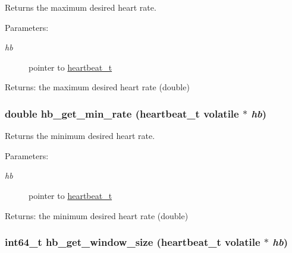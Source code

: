 Returns the maximum desired heart rate. 

\begin{Desc}
\item[Parameters:]
\begin{description}
\item[{\em hb}]pointer to \hyperlink{structheartbeat__t}{heartbeat\_\-t} \end{description}
\end{Desc}
\begin{Desc}
\item[Returns:]the maximum desired heart rate (double) \end{Desc}
\hypertarget{heartbeat-shared_8c_96fa03d16ef34067e63860cea57b71db}{
\subsubsection[hb\_\-get\_\-min\_\-rate]{\setlength{\rightskip}{0pt plus 5cm}double hb\_\-get\_\-min\_\-rate ({\bf heartbeat\_\-t} volatile $\ast$ {\em hb})}}
\label{heartbeat-shared_8c_96fa03d16ef34067e63860cea57b71db}


Returns the minimum desired heart rate. 

\begin{Desc}
\item[Parameters:]
\begin{description}
\item[{\em hb}]pointer to \hyperlink{structheartbeat__t}{heartbeat\_\-t} \end{description}
\end{Desc}
\begin{Desc}
\item[Returns:]the minimum desired heart rate (double) \end{Desc}
\hypertarget{heartbeat-shared_8c_1e6ea5f3c95dd936082274969dba0ee8}{
\subsubsection[hb\_\-get\_\-window\_\-size]{\setlength{\rightskip}{0pt plus 5cm}int64\_\-t hb\_\-get\_\-window\_\-size ({\bf heartbeat\_\-t} volatile $\ast$ {\em hb})}}
\label{heartbeat-shared_8c_1e6ea5f3c95dd936082274969dba0ee8}


